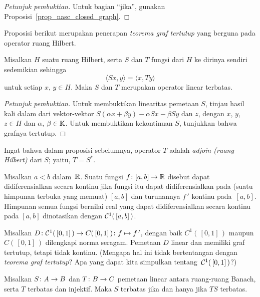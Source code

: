 \begin{proof}[\emph{Petunjuk pembuktian}] Untuk bagian ``jika'', gunakan Proposisi~\ref{prop_nasc_closed_graph}.  \ns
\end{proof}

Proposisi berikut merupakan penerapan \emph{teorema graf tertutup} yang berguna pada operator ruang Hilbert.

\begin{prop} Misalkan $H$ suatu ruang Hilbert, serta $S$ dan $T$ fungsi dari $H$ ke dirinya sendiri sedemikian sehingga
    \[ \langle Sx,y \rangle = \langle x,Ty \rangle \]
untuk setiap $x$, $y \in H$.  Maka $S$ dan $T$ merupakan operator linear terbatas.
\end{prop}

\begin{proof}[\emph{Petunjuk pembuktian}] Untuk membuktikan linearitas pemetaan $S$, tinjau hasil kali dalam dari vektor-vektor
$S(\alpha x + \beta y) - \alpha Sx - \beta Sy$ dan $z$, dengan $x$, $y$, $z \in H$ dan $\alpha$, $\beta \in \mathbb{K}$.
Untuk membuktikan kekontinuan $S$, tunjukkan bahwa grafnya tertutup.  \ns
\end{proof}

Ingat bahwa dalam proposisi sebelumnya, operator $T$ adalah \emph{adjoin (ruang Hilbert)} dari $S$;
yaitu, $T = S^*$.

\begin{defn} Misalkan $a < b$ dalam~$\mathbb{R}$. Suatu fungsi $f\colon [a,b] \rightarrow \mathbb{R}$ disebut
dapat didiferensialkan secara kontinu jika fungsi itu dapat didiferensialkan pada (suatu himpunan terbuka yang memuat) $[a,b]$
dan turunannya $f\,'$ kontinu pada~$[a,b]$.  Himpunan semua fungsi bernilai real yang dapat
didiferensialkan secara kontinu pada $[a,b]$ dinotasikan dengan $\mathcal{C}^1(\,[a,b]\,)$.
\end{defn}

\begin{exam} Misalkan $D\colon \mathcal{C}^1(\,[0,1]\,) \rightarrow C(\,[0,1]\,)\colon f \mapsto f\,'$, dengan
baik $C^1(\,[0,1]\,)$ maupun $C(\,[0,1]\,)$ dilengkapi norma seragam. Pemetaan
$D$ linear dan memiliki graf tertutup, tetapi tidak kontinu.  (Mengapa hal ini tidak bertentangan dengan
\emph{teorema graf tertutup}?  Apa yang dapat kita simpulkan tentang~$\mathcal{C}^1(\,[0,1]\,)$?)
\end{exam}

\begin{prop} Misalkan $S\colon A \rightarrow B$ dan $T\colon B \rightarrow C$ pemetaan linear antara
ruang-ruang Banach, serta $T$ terbatas dan injektif.  Maka $S$ terbatas jika dan hanya jika $TS$ terbatas.
\end{prop}











